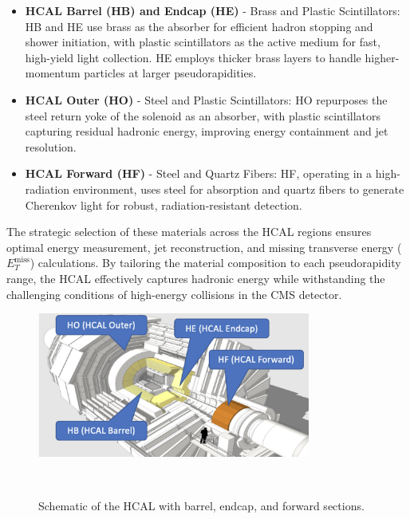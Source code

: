 \begin{itemize}
    \item \textbf{HCAL Barrel (HB) and Endcap (HE)} - Brass and Plastic Scintillators:
    HB and HE use brass as the absorber for efficient hadron stopping and shower initiation, with plastic scintillators as the active medium for fast, high-yield light collection. HE employs thicker brass layers to handle higher-momentum particles at larger pseudorapidities.
    
    \item \textbf{HCAL Outer (HO)} - Steel and Plastic Scintillators:
    HO repurposes the steel return yoke of the solenoid as an absorber, with plastic scintillators capturing residual hadronic energy, improving energy containment and jet resolution.
    
    \item \textbf{HCAL Forward (HF)} - Steel and Quartz Fibers:
    HF, operating in a high-radiation environment, uses steel for absorption and quartz fibers to generate Cherenkov light for robust, radiation-resistant detection.
    
\end{itemize}

The strategic selection of these materials across the HCAL regions ensures optimal energy measurement, jet reconstruction, and missing transverse energy ($E_T^{\text{miss}}$) calculations. By tailoring the material composition to each pseudorapidity range, the HCAL effectively captures hadronic energy while withstanding the challenging conditions of high-energy collisions in the CMS detector.

\begin{figure}[ht]
    \centering
    \includegraphics[width=0.8\textwidth]{Figures/HCAL.jpg} %
    \caption{Schematic of the HCAL with barrel, endcap, and forward sections.}~\cite{hcal_picture}
    \label{fig:hcal}
\end{figure}

